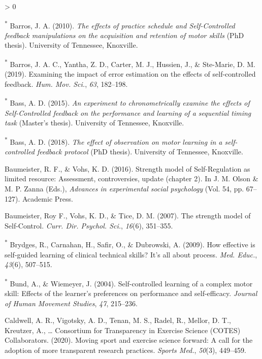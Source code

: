 \documentclass[
  english,
  man,floatsintext]{apa7}
\newlength{\cslhangindent}
\newenvironment{CSLReferences}[2] %
 {%
  \setlength{\parindent}{0pt}
  \ifodd #1 \everypar{\setlength{\hangindent}{\cslhangindent}}\ignorespaces\fi
  \ifnum #2 > 0
  \setlength{\parskip}{#2\baselineskip}
  \fi
 }%
 {}
\begin{document}
\begin{CSLReferences}{1}{0}
\leavevmode\hypertarget{ref-Barros2010-pc}{}%
\textsuperscript{*} Barros, J. A. (2010). \emph{The effects of practice schedule and {Self-Controlled} feedback manipulations on the acquisition and retention of motor skills} (PhD thesis). University of Tennessee, Knoxville.

\leavevmode\hypertarget{ref-Barros2019-my}{}%
\textsuperscript{*} Barros, J. A. C., Yantha, Z. D., Carter, M. J., Hussien, J., \& Ste-Marie, D. M. (2019). Examining the impact of error estimation on the effects of self-controlled feedback. \emph{Hum. Mov. Sci.}, \emph{63}, 182--198.

\leavevmode\hypertarget{ref-Bass2015-cc}{}%
\textsuperscript{*} Bass, A. D. (2015). \emph{An experiment to chronometrically examine the effects of {Self-Controlled} feedback on the performance and learning of a sequential timing task} (Master's thesis). University of Tennessee, Knoxville.

\leavevmode\hypertarget{ref-Bass2018-vz}{}%
\textsuperscript{*} Bass, A. D. (2018). \emph{The effect of observation on motor learning in a self-controlled feedback protocol} (PhD thesis). University of Tennessee, Knoxville.

\leavevmode\hypertarget{ref-Baumeister2016-df}{}%
Baumeister, R. F., \& Vohs, K. D. (2016). Strength model of {Self-Regulation} as limited resource: Assessment, controversies, update (chapter 2). In J. M. Olson \& M. P. Zanna (Eds.), \emph{Advances in experimental social psychology} (Vol. 54, pp. 67--127). Academic Press.

\leavevmode\hypertarget{ref-Baumeister2007-rb}{}%
Baumeister, Roy F., Vohs, K. D., \& Tice, D. M. (2007). The strength model of {Self-Control}. \emph{Curr. Dir. Psychol. Sci.}, \emph{16}(6), 351--355.

\leavevmode\hypertarget{ref-Brydges2009-zb}{}%
\textsuperscript{*} Brydges, R., Carnahan, H., Safir, O., \& Dubrowski, A. (2009). How effective is self-guided learning of clinical technical skills? It's all about process. \emph{Med. Educ.}, \emph{43}(6), 507--515.

\leavevmode\hypertarget{ref-Bund2004-hy}{}%
\textsuperscript{*} Bund, A., \& Wiemeyer, J. (2004). Self-controlled learning of a complex motor skill: Effects of the learner's preferences on performance and self-efficacy. \emph{Journal of Human Movement Studies}, \emph{47}, 215--236.

\leavevmode\hypertarget{ref-Caldwell2020-jg}{}%
Caldwell, A. R., Vigotsky, A. D., Tenan, M. S., Radel, R., Mellor, D. T., Kreutzer, A., \ldots{} Consortium for Transparency in Exercise Science (COTES) Collaborators. (2020). Moving sport and exercise science forward: A call for the adoption of more transparent research practices. \emph{Sports Med.}, \emph{50}(3), 449--459.


\end{CSLReferences}
\end{document}
